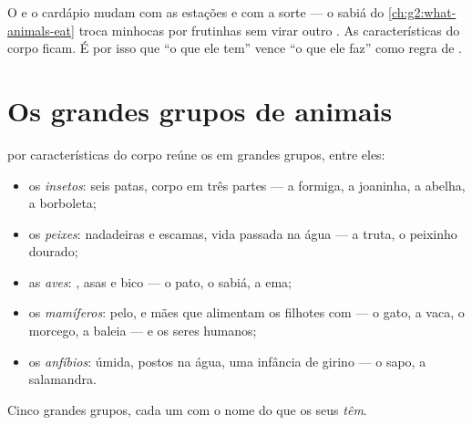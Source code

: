 \begin{remark}\label{rem:g3:sorting-living-things:why}
O  e o cardápio mudam com as estações e com a sorte --- o
sabiá do \cref{ch:g2:what-animals-eat} troca minhocas por frutinhas
sem virar outro . As características do corpo ficam. É por
isso que ``o que ele tem'' vence ``o que ele faz'' como regra de
.
\end{remark}

\section{Os grandes grupos de animais}

\begin{proposition}\label{prop:g3:sorting-living-things:groups}
 por características do corpo reúne os  em grandes
grupos, entre eles:
\begin{itemize}
  \item os \emph{insetos}: seis patas, corpo em três
        partes --- a formiga, a joaninha, a abelha, a borboleta;
  \item os \emph{peixes}: nadadeiras e escamas, vida
        passada na água --- a truta, o peixinho dourado;
  \item as \emph{aves}: , asas e bico --- o pato, o
        sabiá, a ema;
  \item os \emph{mamíferos}: pelo, e mães que
        alimentam os filhotes com  --- o gato, a vaca, o
        morcego, a baleia --- e os seres humanos;
  \item os \emph{anfíbios}:  úmida,  postos
        na água, uma infância de girino --- o sapo, a salamandra.
\end{itemize}
\end{proposition}
\admitted

\begin{omfigure}

{\small Cinco grandes grupos, cada um com o nome do que os seus
 \emph{têm}.}
\end{omfigure}

